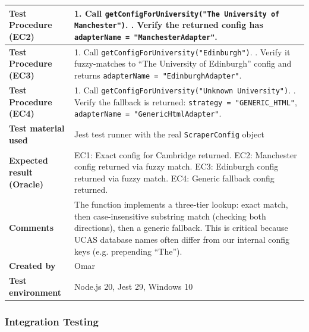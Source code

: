 \begin{table}[h!]
\begin{tabular}{|p{}|p{}|}
\textbf{Test Procedure (EC2)} & 1. Call \texttt{getConfigForUniversity("The University of Manchester")}. \newline 2. Verify the returned config has \texttt{adapterName = "ManchesterAdapter"}. \\ \hline
\textbf{Test Procedure (EC3)} & 1. Call \texttt{getConfigForUniversity("Edinburgh")}. \newline 2. Verify it fuzzy-matches to ``The University of Edinburgh'' config and returns \texttt{adapterName = "EdinburghAdapter"}. \\ \hline
\textbf{Test Procedure (EC4)} & 1. Call \texttt{getConfigForUniversity("Unknown University")}. \newline 2. Verify the fallback is returned: \texttt{strategy = "GENERIC\_HTML"}, \texttt{adapterName = "GenericHtmlAdapter"}. \\ \hline
\textbf{Test material used} & Jest test runner with the real \texttt{ScraperConfig} object \\ \hline
\textbf{Expected result (Oracle)} & EC1: Exact config for Cambridge returned. \newline EC2: Manchester config returned via fuzzy match. \newline EC3: Edinburgh config returned via fuzzy match. \newline EC4: Generic fallback config returned. \\ \hline
\textbf{Comments} & The function implements a three-tier lookup: exact match, then case-insensitive substring match (checking both directions), then a generic fallback. This is critical because UCAS database names often differ from our internal config keys (e.g. prepending ``The''). \\ \hline
\textbf{Created by} & Omar \\ \hline
\textbf{Test environment} & Node.js 20, Jest 29, Windows 10 \\ \hline
\end{tabular}
\end{table}


\subsubsection{Integration Testing}


